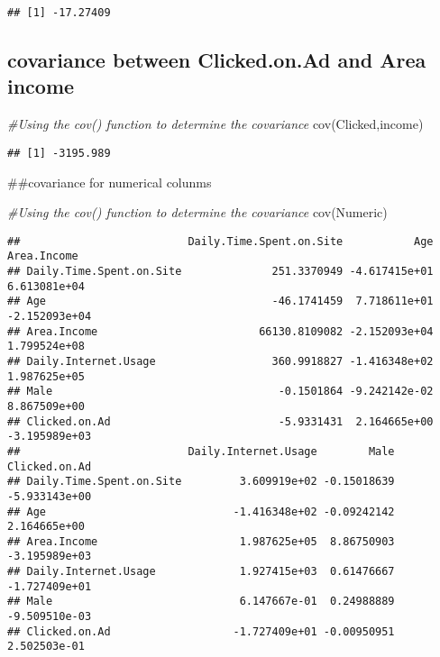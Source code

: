 \documentclass[
]{article}
\newenvironment{Shaded}{\begin{snugshade}}{\end{snugshade}}
\newcommand{\CommentTok}[1]{\textcolor[rgb]{0.56,0.35,0.01}{\textit{#1}}}
\newcommand{\FunctionTok}[1]{\textcolor[rgb]{0.00,0.00,0.00}{#1}}
\newcommand{\NormalTok}[1]{#1}
\begin{document}
\begin{verbatim}
## [1] -17.27409
\end{verbatim}

\hypertarget{covariance-between-clicked.on.ad-and-area-income}{%
\subsection{covariance between Clicked.on.Ad and Area
income}\label{covariance-between-clicked.on.ad-and-area-income}}

\begin{Shaded}
\begin{Highlighting}[]
\CommentTok{\#Using the cov() function to determine the covariance}
\FunctionTok{cov}\NormalTok{(Clicked,income)}
\end{Highlighting}
\end{Shaded}

\begin{verbatim}
## [1] -3195.989
\end{verbatim}

\#\#covariance for numerical colunms

\begin{Shaded}
\begin{Highlighting}[]
\CommentTok{\#Using the cov() function to determine the covariance}
\FunctionTok{cov}\NormalTok{(Numeric)}
\end{Highlighting}
\end{Shaded}

\begin{verbatim}
##                          Daily.Time.Spent.on.Site           Age   Area.Income
## Daily.Time.Spent.on.Site              251.3370949 -4.617415e+01  6.613081e+04
## Age                                   -46.1741459  7.718611e+01 -2.152093e+04
## Area.Income                         66130.8109082 -2.152093e+04  1.799524e+08
## Daily.Internet.Usage                  360.9918827 -1.416348e+02  1.987625e+05
## Male                                   -0.1501864 -9.242142e-02  8.867509e+00
## Clicked.on.Ad                          -5.9331431  2.164665e+00 -3.195989e+03
##                          Daily.Internet.Usage        Male Clicked.on.Ad
## Daily.Time.Spent.on.Site         3.609919e+02 -0.15018639 -5.933143e+00
## Age                             -1.416348e+02 -0.09242142  2.164665e+00
## Area.Income                      1.987625e+05  8.86750903 -3.195989e+03
## Daily.Internet.Usage             1.927415e+03  0.61476667 -1.727409e+01
## Male                             6.147667e-01  0.24988889 -9.509510e-03
## Clicked.on.Ad                   -1.727409e+01 -0.00950951  2.502503e-01
\end{verbatim}
\end{document}
